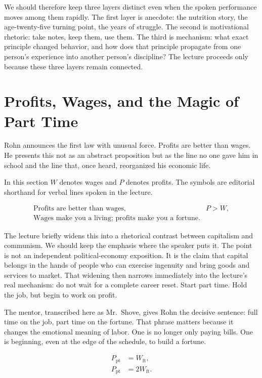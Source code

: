 We should therefore keep three layers distinct even when the spoken performance moves among them rapidly. The first layer is anecdote: the nutrition story, the age-twenty-five turning point, the years of struggle. The second is motivational rhetoric: take notes, keep them, use them. The third is mechanism: what exact principle changed behavior, and how does that principle propagate from one person's experience into another person's discipline? The lecture proceeds only because these three layers remain connected.

\section{Profits, Wages, and the Magic of Part Time}

Rohn announces the first law with unusual force. Profits are better than wages. He presents this not as an abstract proposition but as the line no one gave him in school and the line that, once heard, reorganized his economic life.

\begin{remark}
In this section \(W\) denotes wages and \(P\) denotes profits. The symbols are editorial shorthand for verbal lines spoken in the lecture.
\end{remark}

\begin{align}
\text{Profits are better than wages,} \qquad & P > W, \\
\text{Wages make you a living; profits make you a fortune.} \nonumber
\end{align}

The lecture briefly widens this into a rhetorical contrast between capitalism and communism. We should keep the emphasis where the speaker puts it. The point is not an independent political-economy exposition. It is the claim that capital belongs in the hands of people who can exercise ingenuity and bring goods and services to market. That widening then narrows immediately into the lecture's real mechanism: do not wait for a complete career reset. Start part time. Hold the job, but begin to work on profit.

The mentor, transcribed here as Mr.~Shove, gives Rohn the decisive sentence: full time on the job, part time on the fortune. That phrase matters because it changes the emotional meaning of labor. One is no longer only paying bills. One is beginning, even at the edge of the schedule, to build a fortune.

\begin{align}
P_{\mathrm{pt}} &= W_{\mathrm{ft}}, \\
P_{\mathrm{pt}} &= 2W_{\mathrm{ft}}.
\end{align}

